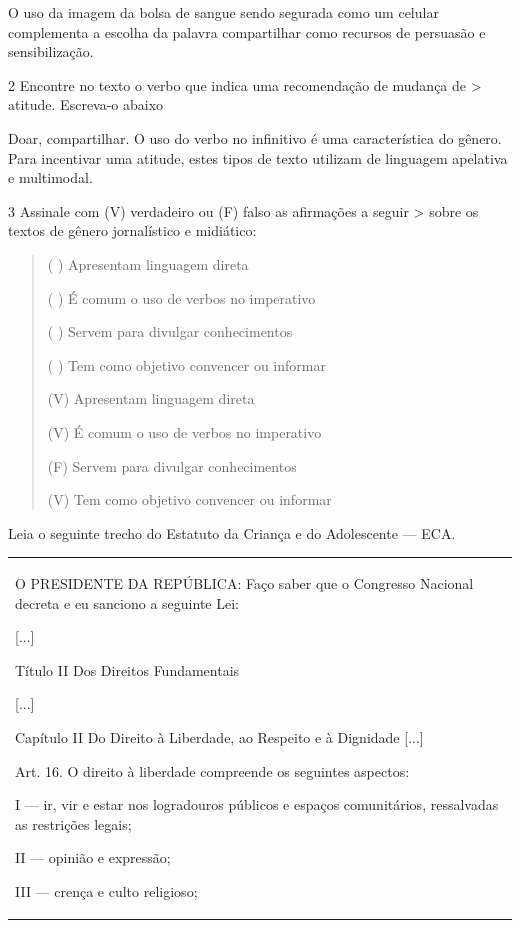 {O uso da imagem da bolsa de sangue sendo segurada como um celular
complementa a escolha da palavra compartilhar como recursos de persuasão
e sensibilização.

\num{2} Encontre no texto o verbo que indica uma recomendação de mudança de \textgreater{} atitude. Escreva-o abaixo

Doar, compartilhar. O uso do verbo no infinitivo é uma característica do
gênero. Para incentivar uma atitude, estes tipos de texto utilizam de
linguagem apelativa e multimodal.

\num{3} Assinale com (V) verdadeiro ou (F) falso as afirmações a seguir \textgreater{} sobre os textos de gênero jornalístico e midiático:

\begin{quote}

( ) Apresentam linguagem direta

( ) É comum o uso de verbos no imperativo

( ) Servem para divulgar conhecimentos

( ) Tem como objetivo convencer ou informar

(V) Apresentam linguagem direta

(V) É comum o uso de verbos no imperativo

(F) Servem para divulgar conhecimentos

(V) Tem como objetivo convencer ou informar
\end{quote}

Leia o seguinte trecho do Estatuto da Criança e do Adolescente --- ECA.

\begin{longtable}[]{@{}
  >{\raggedright\arraybackslash}p{}@{}}
\toprule
\endhead
O PRESIDENTE DA REPÚBLICA: Faço saber que o Congresso Nacional decreta e
eu sanciono a seguinte Lei:

{[}...{]}

Título II Dos Direitos Fundamentais

{[}...{]}

Capítulo II Do Direito à Liberdade, ao Respeito e à Dignidade {[}...{]}

Art. 16. O direito à liberdade compreende os seguintes aspectos:

I --- ir, vir e estar nos logradouros públicos e espaços comunitários,
ressalvadas as restrições legais;

II --- opinião e expressão;

III --- crença e culto religioso;


\end{longtable}}
